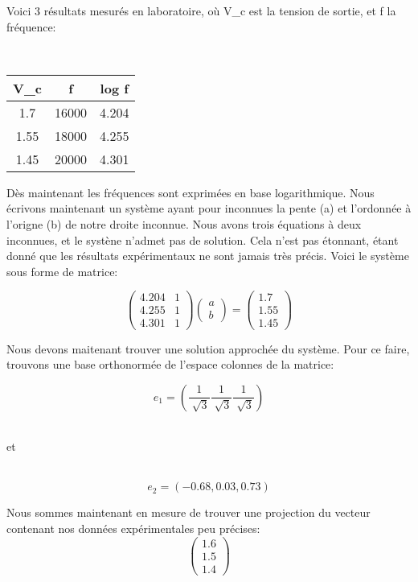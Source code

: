 \documentclass{article}
\begin{document}
Voici 3 résultats mesurés en laboratoire, où V_c est la tension de sortie, et f la fréquence:

\bigbreak
\\
\begin{tabular}{|c|c|c|}
\hline
V_c & f & log{ f} \\
\hline
1.7 & 16000 & 4.204\\
\hline
1.55 & 18000 & 4.255\\
\hline
1.45 & 20000 & 4.301 \\
\hline
\end{tabular}

\bigbreak
Dès maintenant les fréquences sont exprimées en base logarithmique.
Nous écrivons maintenant un système ayant pour inconnues la pente (a) et l'ordonnée à l'origne (b) de notre droite inconnue. Nous avons trois équations à deux inconnues, et le systène n'admet pas de solution. Cela n'est pas étonnant, étant donné que les résultats expérimentaux ne sont jamais très précis.
Voici le système sous forme de matrice:
\bigbreak

$$
\begin{pmatrix}  
 4.204 & 1\\
 4.255 & 1 \\
 4.301 & 1 
\end{pmatrix}
\begin{pmatrix}  
a\\
b
\end{pmatrix}
=
\begin{pmatrix}  
1.7\\
1.55\\
1.45
\end{pmatrix}
$$

\bigbreak
Nous devons maitenant trouver une solution approchée du système. Pour ce faire, trouvons une base orthonormée de l'espace colonnes de la matrice:

\[e_1=( \frac{1}{\sqrt[]{3}} \frac{1}{\sqrt[]{3}} \frac{1}{\sqrt[]{3}})\]

\\ et

\\
\[e_2=( -0.68, 0.03, 0.73)\]

\bigbreak
Nous sommes maintenant en mesure de trouver une projection du vecteur contenant nos données expérimentales peu précises:
$$
\begin{pmatrix}  
1.6\\
1.5\\
1.4
\end{pmatrix}$$
$$
\end{document}
